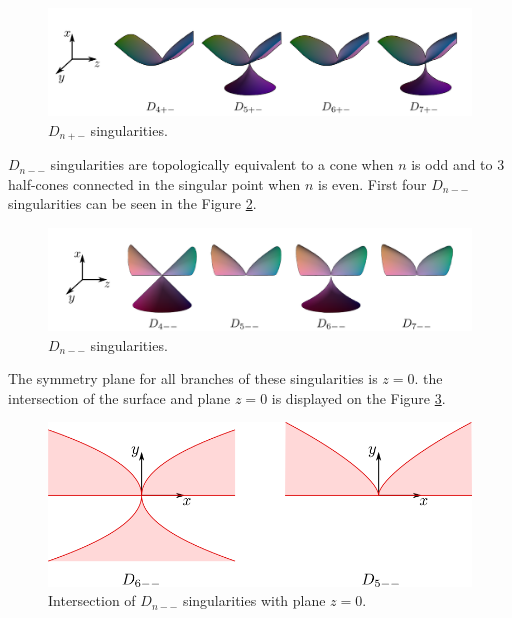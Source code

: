 \begin{figure}
    \centerline{\includegraphics[scale=0.5]{images/img7}}
    \caption[$D_{n+-}$ singularities TODO the coordinates are wrong!!]
    {$D_{n+-}$ singularities. \cite{morris2003client}}
    \label{img:7}
\end{figure}


$D_{n--}$ singularities are topologically equivalent to a cone when $n$ is
odd and to 3 half-cones connected in the singular point when $n$ is even.
First four $D_{n--}$ singularities can be seen in the Figure \ref{img:8}.

\begin{figure}
    \centerline{\includegraphics[scale=0.5]{images/img8}}
    \caption[$D_{n--}$ singularities TODO the coordinates are wrong!!]
    {$D_{n--}$ singularities. \cite{morris2003client}}
    \label{img:8}
\end{figure}

The symmetry plane for all branches of these singularities is $z=0$.
the intersection of the surface and plane $z=0$ is displayed on the Figure \ref{img:6}.

\begin{figure}
    \centerline{\includegraphics[scale=0.5]{images/img6}}
    \caption[Intersection of $D_{n--}$ singularities with plane $z=0$.]
    {Intersection of $D_{n--}$ singularities with plane $z=0$.}
    \label{img:6}
\end{figure}

